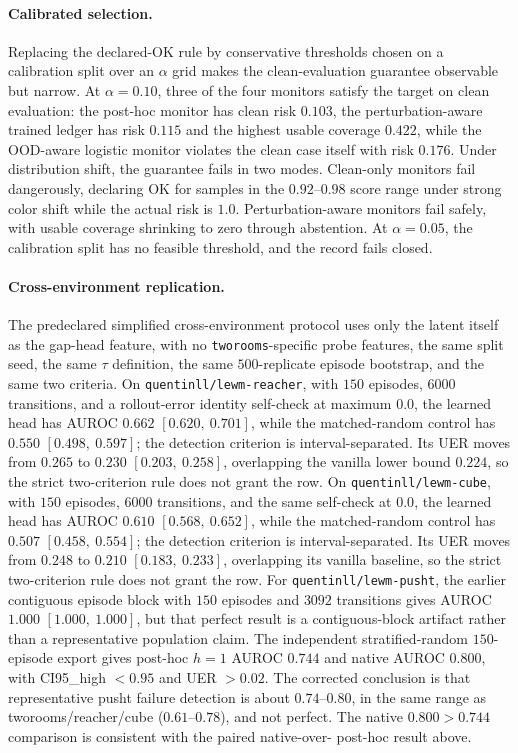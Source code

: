 \paragraph{Calibrated selection.}
Replacing the declared-OK rule by conservative thresholds chosen on a
calibration split over an $\alpha$ grid makes the clean-evaluation guarantee
observable but narrow.  At $\alpha = 0.10$, three of the four monitors satisfy
the target on clean evaluation: the post-hoc monitor has clean risk $0.103$,
the perturbation-aware trained ledger has risk $0.115$ and the highest usable
coverage $0.422$, while the OOD-aware logistic monitor violates the clean case
itself with risk $0.176$.  Under distribution shift, the guarantee fails in
two modes.  Clean-only monitors fail dangerously, declaring OK for samples in
the $0.92$--$0.98$ score range under strong color shift while the actual risk
is $1.0$.  Perturbation-aware monitors fail safely, with usable coverage
shrinking to zero through abstention.  At $\alpha = 0.05$, the calibration
split has no feasible threshold, and the record fails closed.

\paragraph{Cross-environment replication.}
The predeclared simplified cross-environment protocol uses only the latent
itself as the gap-head feature, with no \texttt{tworooms}-specific probe
features, the same split seed, the same $\tau$ definition, the same
$500$-replicate episode bootstrap, and the same two criteria.  On
\texttt{quentinll/lewm-reacher}, with $150$ episodes, $6000$ transitions, and
a rollout-error identity self-check at maximum $0.0$, the learned head has
AUROC $0.662$ $[0.620,\ 0.701]$, while the matched-random control has $0.550$
$[0.498,\ 0.597]$; the detection criterion is interval-separated.  Its UER
moves from $0.265$ to $0.230$ $[0.203,\ 0.258]$, overlapping the vanilla lower
bound $0.224$, so the strict two-criterion rule does not grant the row.  On
\texttt{quentinll/lewm-cube}, with $150$ episodes, $6000$ transitions, and the
same self-check at $0.0$, the learned head has AUROC $0.610$
$[0.568,\ 0.652]$, while the matched-random control has $0.507$
$[0.458,\ 0.554]$; the detection criterion is interval-separated.  Its UER
moves from $0.248$ to $0.210$ $[0.183,\ 0.233]$, overlapping its vanilla
baseline, so the strict two-criterion rule does not grant the row.  For
\texttt{quentinll/lewm-pusht}, the earlier contiguous episode block with
$150$ episodes and $3092$ transitions gives AUROC $1.000$ $[1.000,\ 1.000]$,
but that perfect result is a contiguous-block artifact rather than a
representative population claim.  The independent stratified-random
$150$-episode export gives post-hoc $h=1$ AUROC $0.744$ and native AUROC
$0.800$, with CI95\_high $<0.95$ and UER $>0.02$.  The corrected conclusion is
that representative pusht failure detection is about $0.74$--$0.80$, in the
same range as tworooms/reacher/cube ($0.61$--$0.78$), and not perfect.  The
native $0.800 > 0.744$ comparison is consistent with the paired native-over-
post-hoc result above.

